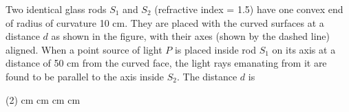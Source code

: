 

    \item Two identical glass rods \( S_1 \) and \( S_2 \) (refractive index = 1.5) have one convex end of radius of curvature 10 cm. They are placed with the curved surfaces at a distance \( d \) as shown in the figure, with their axes (shown by the dashed line) aligned. When a point source of light \( P \) is placed inside rod \( S_1 \) on its axis at a distance of 50 cm from the curved face, the light rays emanating from it are found to be parallel to the axis inside \( S_2 \). The distance \( d \) is
    \begin{center}
    \end{center}
        \begin{tasks}(2)
             cm
             cm
             cm
             cm
        \end{tasks}
        

